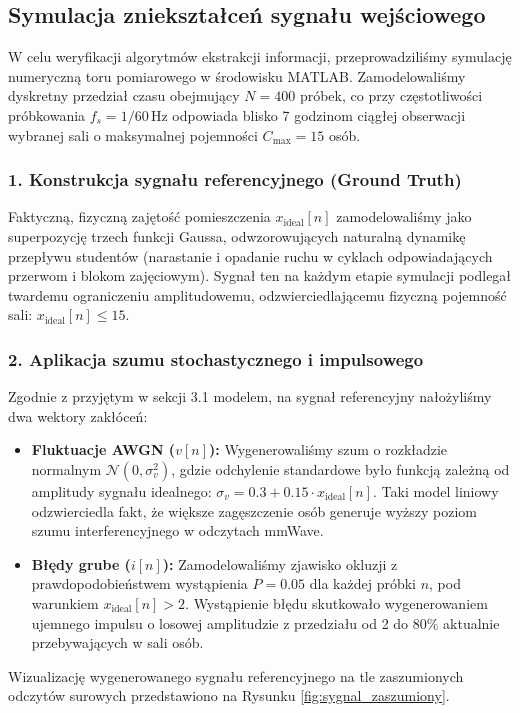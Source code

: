 \documentclass[14pt,a4paper]{extarticle}
\begin{document}
\subsection{Symulacja zniekształceń sygnału wejściowego}
W celu weryfikacji algorytmów ekstrakcji informacji, przeprowadziliśmy symulację numeryczną toru pomiarowego w środowisku MATLAB. Zamodelowaliśmy dyskretny przedział czasu obejmujący $N = 400$ próbek, co przy częstotliwości próbkowania $f_s = 1/60$\,Hz odpowiada blisko 7 godzinom ciągłej obserwacji wybranej sali o maksymalnej pojemności $C_{\text{max}} = 15$ osób.

\subsubsection*{1. Konstrukcja sygnału referencyjnego (Ground Truth)}
Faktyczną, fizyczną zajętość pomieszczenia $x_{\text{ideal}}[n]$ zamodelowaliśmy jako superpozycję trzech funkcji Gaussa, odwzorowujących naturalną dynamikę przepływu studentów (narastanie i opadanie ruchu w cyklach odpowiadających przerwom i blokom zajęciowym). Sygnał ten na każdym etapie symulacji podlegał twardemu ograniczeniu amplitudowemu, odzwierciedlającemu fizyczną pojemność sali: $x_{\text{ideal}}[n] \le 15$.

\subsubsection*{2. Aplikacja szumu stochastycznego i impulsowego}
Zgodnie z przyjętym w sekcji 3.1 modelem, na sygnał referencyjny nałożyliśmy dwa wektory zakłóceń:
\begin{itemize}
    \item \textbf{Fluktuacje AWGN ($v[n]$):} Wygenerowaliśmy szum o rozkładzie normalnym $\mathcal{N}(0, \sigma_v^2)$, gdzie odchylenie standardowe było funkcją zależną od amplitudy sygnału idealnego: $\sigma_v = 0.3 + 0.15 \cdot x_{\text{ideal}}[n]$. Taki model liniowy odzwierciedla fakt, że większe zagęszczenie osób generuje wyższy poziom szumu interferencyjnego w odczytach mmWave.
    \item \textbf{Błędy grube ($i[n]$):} Zamodelowaliśmy zjawisko okluzji z prawdopodobieństwem wystąpienia $P=0.05$ dla każdej próbki $n$, pod warunkiem $x_{\text{ideal}}[n] > 2$. Wystąpienie błędu skutkowało wygenerowaniem ujemnego impulsu o losowej amplitudzie z przedziału od 2 do 80\% aktualnie przebywających w sali osób.
\end{itemize}

Wizualizację wygenerowanego sygnału referencyjnego na tle zaszumionych odczytów surowych przedstawiono na Rysunku \ref{fig:sygnal_zaszumiony}.
\end{document}
